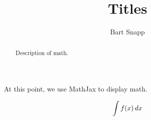 \documentclass{ximera}
\title{Titles}
\author{Bart Snapp}
\begin{document}
\begin{abstract}
  Description of math.
\end{abstract}
\maketitle

At this point, we use MathJax to display math.

\[
\int f(x) \,d x
\]
\end{document}
